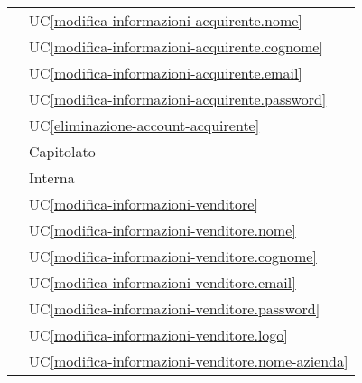 \begin{longtable}{C{6cm} C{6cm}}
     & UC\ref{modifica-informazioni-acquirente.nome} \\

     & UC\ref{modifica-informazioni-acquirente.cognome} \\

     & UC\ref{modifica-informazioni-acquirente.email} \\

     & UC\ref{modifica-informazioni-acquirente.password} \\

     & UC\ref{eliminazione-account-acquirente} \\

     & Capitolato \\

     & Interna \\

     & UC\ref{modifica-informazioni-venditore} \\
        
     & UC\ref{modifica-informazioni-venditore.nome} \\
        
     & UC\ref{modifica-informazioni-venditore.cognome} \\
        
     & UC\ref{modifica-informazioni-venditore.email} \\

     & UC\ref{modifica-informazioni-venditore.password} \\
        
     & UC\ref{modifica-informazioni-venditore.logo} \\
        
     & UC\ref{modifica-informazioni-venditore.nome-azienda} \\
        

\end{longtable}
